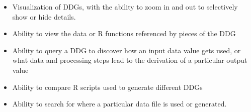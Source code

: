 \documentclass[12pt]{article}
\newcommand\liststyleWWviiiNumii{%
\renewcommand\labelitemi{•}
\renewcommand\labelitemii{•}
\renewcommand\labelitemiii{•}
\renewcommand\labelitemiv{•}
}
\begin{document}
\liststyleWWviiiNumii
\begin{itemize}
\item {\color{black}
Visualization of DDGs, with the ability to zoom in and out to selectively show or hide details.}
\item {\color{black}
Ability to view the data or R functions referenced by pieces of the DDG}
\item {\color{black}
Ability to query a DDG to discover how an input data value gets used, or what data and processing steps lead to the derivation of a particular output value}
\item {\color{black}
Ability to compare R scripts used to generate different DDGs}
\item {\color{black}
Ability to search for where a particular data file is used or generated.}
\end{itemize}
\end{document}
